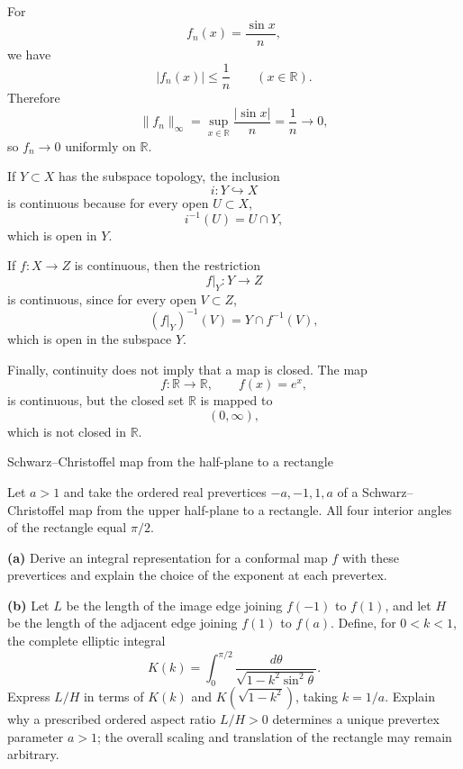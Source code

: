 \begin{solution}
For
\[
f_n(x)=\frac{\sin x}{n},
\]
we have
\[
|f_n(x)|
\le
\frac1n
\qquad (x\in\mathbb R).
\]
Therefore
\[
\|f_n\|_\infty
=
\sup_{x\in\mathbb R}\frac{|\sin x|}{n}
=
\frac1n
\longrightarrow0,
\]
so \(f_n\to0\) uniformly on \(\mathbb R\).

If \(Y\subset X\) has the subspace topology, the inclusion
\[
i:Y\hookrightarrow X
\]
is continuous because for every open \(U\subset X\),
\[
i^{-1}(U)=U\cap Y,
\]
which is open in \(Y\).

If \(f:X\to Z\) is continuous, then the restriction
\[
f|_Y:Y\to Z
\]
is continuous, since for every open \(V\subset Z\),
\[
(f|_Y)^{-1}(V)
=
Y\cap f^{-1}(V),
\]
which is open in the subspace \(Y\).

Finally, continuity does not imply that a map is closed. The map
\[
f:\mathbb R\to\mathbb R,
\qquad
f(x)=e^x,
\]
is continuous, but the closed set \(\mathbb R\) is mapped to
\[
(0,\infty),
\]
which is not closed in \(\mathbb R\).
\end{solution}


\begin{problem}[CP-IV-0045]
\label{prob:cp-iv-0045}
Schwarz--Christoffel map from the half-plane to a rectangle

Let $a>1$ and take the ordered real prevertices $-a,-1,1,a$ of a
Schwarz--Christoffel map from the upper half-plane to a rectangle.
All four interior angles of the rectangle equal $\pi/2$.

\par\noindent\textbf{(a)} Derive an integral representation for a conformal map
$f$ with these prevertices and explain the choice of the exponent at each
prevertex.

\par\noindent\textbf{(b)} Let $L$ be the length of the image edge joining
$f(-1)$ to $f(1)$, and let $H$ be the length of the adjacent edge joining
$f(1)$ to $f(a)$. Define, for $0<k<1$, the complete elliptic integral
\[
K(k)=\int_0^{\pi/2}\frac{d\theta}{\sqrt{1-k^2\sin^2\theta}}.
\]
Express $L/H$ in terms of $K(k)$ and $K(\sqrt{1-k^2})$, taking $k=1/a$.
Explain why a prescribed ordered aspect ratio $L/H>0$ determines a unique
prevertex parameter $a>1$; the overall scaling and translation of the
rectangle may remain arbitrary.

\end{problem}

